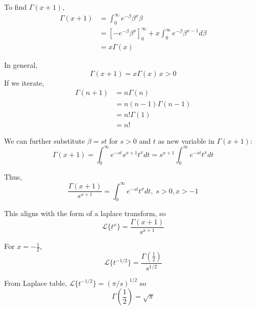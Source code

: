To find $\Gamma(x+1)$,
\begin{align*}
    \Gamma(x+1)&=\int_0^\infty e^{-\beta}\beta^x\beta\\
    &=\left[-e^{-\beta}\beta^x\right]_0^\infty + x\int_0^\infty e^{-\beta}\beta^{x-1}d\beta\\
    &=x\Gamma(x)
\end{align*}

In general,
\begin{equation}
    \Gamma(x+1)=x\Gamma(x)\,x>0
\end{equation}
If we iterate,
\begin{align*}
    \Gamma(n+1)&=n\Gamma(n)\\
    &=n(n-1)\Gamma(n-1)\\
    &=n!\Gamma(1)\\
    &=n!
\end{align*}

We can further substitute $\beta=st$ for $s>0$ and $t$ as new variable in $\Gamma(x+1)$:
\begin{equation*}
    \Gamma(x+1)=\int_0^\infty e^{-st}s^{x+1}t^xdt=s^{x+1}\int_0^\infty e^{-st}t^xdt
\end{equation*}

Thus,
\begin{equation}
    \frac{\Gamma(x+1)}{s^{x+1}}=\int_0^\infty e^{-st}t^xdt,\;s>0,x>-1
\end{equation}

This aligns with the form of a laplace transform, so
\begin{equation}
    \mathcal{L}\{t^x\}=\frac{\Gamma(x+1)}{s^{x+1}}
\end{equation}

For $x=-\frac{1}{2}$,
\begin{equation*}
    \mathcal{L}\{t^{-1/2}\}=\frac{\Gamma(\frac{1}{2})}{s^{1/2}}
\end{equation*}

From Laplace table, $\mathcal{L}\{t^{-1/2}\}=(\pi/s)^{1/2}$ so
$$ \Gamma\left(\frac{1}{2}\right)=\sqrt{\pi} $$